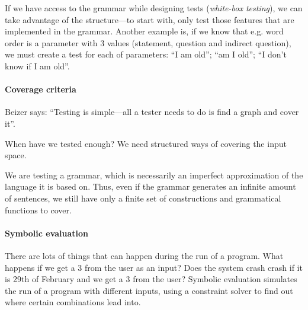 If we have access to the grammar while designing tests
(\emph{white-box testing}), we can take advantage of the
structure---to start with, only test those features that are
implemented in the grammar. Another example is, if we know that
e.g. word order is a parameter with 3 values (statement, question and
indirect question), we must create a test for each of parameters: ``I am
old''; ``am I old''; ``I don't know if I am old''.




\paragraph{Coverage criteria}

Beizer \cite{beizer2003software} says: ``Testing is simple---all a
tester needs to do is find a graph and cover it''.

When have we tested enough? We need structured ways of covering the input
space.

We are testing a grammar, which is necessarily an imperfect
approximation of the language it is based on. Thus, even if the
grammar generates an infinite amount of sentences, we still have only
a finite set of constructions and grammatical functions to cover.

\paragraph{Symbolic evaluation}

There are lots of things that can happen during the run of a
program. What happens if we get a 3 from the user as an input? Does
the system crash crash if it is 29th of February and we get a 3 from
the user?  Symbolic evaluation simulates the run of a program with
different inputs, using a constraint solver to find out where certain
combinations lead into.



